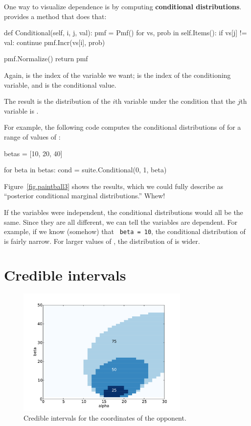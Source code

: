 \documentclass[12pt]{book}
\theoremstyle{exercise}
\begin{document}
One way to visualize dependence is by computing {\bf conditional
distributions}.   provides a method that
does that:

\begin{code}
    def Conditional(self, i, j, val):
        pmf = Pmf()
        for vs, prob in self.Items():
            if vs[j] != val: continue
            pmf.Incr(vs[i], prob)

        pmf.Normalize()
        return pmf
\end{code}

Again,  is the index of the variable we want; 
is the index of the conditioning variable, and  is the
conditional value.

The result is the distribution of the $i$th variable under the
condition that the $j$th variable is .

For example, the following code computes the conditional distributions
of  for a range of values of :

\begin{code}
    betas = [10, 20, 40]

    for beta in betas:
        cond = suite.Conditional(0, 1, beta)
\end{code}

Figure~\ref{fig.paintball3} shows the results, which we could
fully describe as ``posterior conditional marginal distributions.''
Whew!

If the variables were independent, the conditional distributions would
all be the same.  Since they are all different, we can tell the
variables are dependent.  For example, if we know (somehow) that {\tt
  beta = 10}, the conditional distribution of  is fairly
narrow.  For larger values of , the distribution of
 is wider.


\section{Credible intervals}

\begin{figure}
\centerline{\includegraphics[height=2.5in]{figs/paintball5.pdf}}
\caption{Credible intervals for the coordinates of the opponent.}
\label{fig.paintball5}
\end{figure}
\end{document}
